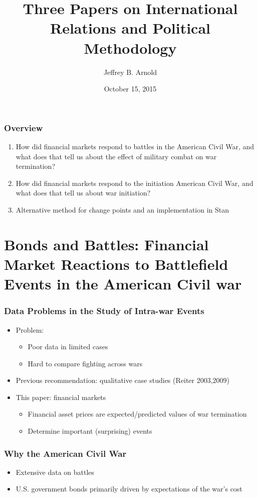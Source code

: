 \documentclass[]{beamer}\usepackage[]{graphicx}\usepackage[]{color}
\title{Three Papers on International Relations and Political Methodology}
\author{Jeffrey B. Arnold}
\date{October 15, 2015}
\begin{document}
\begin{frame}
  \titlepage{}
\end{frame}

\begin{frame}
  \frametitle{Overview}
  \begin{enumerate}
  \item How did financial markets respond to battles in the American Civil War, and 
    what does that tell us about the effect of military combat on war termination?
  \item How did financial markets respond to the initiation American Civil War, and 
    what does that tell us about war initiation?
  \item  Alternative method for change points and an implementation in Stan
  \end{enumerate}

\end{frame}

\section{Bonds and Battles: Financial Market Reactions to Battlefield Events in the American Civil war}

\begin{frame}
  \frametitle{Data Problems in the Study of Intra-war Events}

  \begin{itemize}
  \item Problem: 
    \begin{itemize}
    \item Poor data in limited cases
    \item Hard to compare fighting across wars
    \end{itemize}
  \item Previous recommendation: qualitative case studies  (Reiter 2003,2009)
  \item This paper: financial markets
    \begin{itemize}
    \item Financial asset prices are expected/predicted values of war termination
    \item Determine important (surprising) events
    \end{itemize}
  \end{itemize}
\end{frame}

\begin{frame}
  \frametitle{Why the American Civil War}

  \begin{itemize}
  \item Extensive data on battles
  \item U.S. government bonds primarily driven by expectations of the war's cost
  \end{itemize}

\end{frame}
\end{document}
